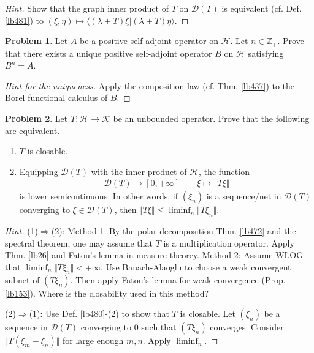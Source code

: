 \documentclass[12pt,b5paper,notitlepage]{article}
\theoremstyle{definition}
\newtheorem{prob}{\color{red}Problem}[section]
\theoremstyle{plain}
\newcommand{\Dom}{\mathscr{D}}
\newcommand{\bk}[1]{\langle {#1}\rangle}
\newcommand{\Zbb}{\mathbb Z}
\newcommand{\Rbb}{\mathbb R}
\newcommand{\MH}{\mathcal H}
\newcommand{\MK}{\mathcal K}
\numberwithin{equation}{section}
\begin{document}
\begin{proof}[Hint]
Show that the graph inner product of $T$ on $\Dom(T)$ is equivalent (cf. Def. \ref{lb481}) to $(\xi,\eta)\mapsto\bk{(\lambda+T)\xi|(\lambda+T)\eta}$.
\end{proof}


\begin{prob}
Let $A$ be a positive self-adjoint operator on $\MH$. Let $n\in\Zbb_+$. Prove that there exists a unique positive self-adjoint operator $B$ on $\MH$ satisfying $B^n=A$.
\end{prob}


\begin{proof}[Hint for the uniqueness]
Apply the composition law (cf. Thm. \ref{lb437}) to the Borel functional calculus of $B$.
\end{proof}


\begin{prob}
Let $T:\MH\rightarrow\MK$ be an unbounded operator. Prove that the following are equivalent.
\begin{enumerate}
\item[(1)] $T$ is closable.
\item[(2)] Equipping $\Dom(T)$ with the inner product of $\MH$, the function
\begin{align*}
\Dom(T)\rightarrow[0,+\infty]\qquad \xi\mapsto \Vert T\xi\Vert
\end{align*} 
is lower semicontinuous. In other words, if $(\xi_n)$ is a sequence/net in $\Dom(T)$ converging to $\xi\in\Dom(T)$, then $\Vert T\xi\Vert\leq\liminf_n\Vert T\xi_n\Vert$.
\end{enumerate}
\end{prob}


\begin{proof}[Hint]
(1)$\Rightarrow$(2): Method 1: By the polar decomposition Thm. \ref{lb472} and the spectral theorem, one may assume that $T$ is a multiplication operator. Apply Thm. \ref{lb26} and Fatou's lemma in measure theorey. Method 2: Assume WLOG that $\liminf_n\Vert T\xi_n\Vert<+\infty$. Use Banach-Alaoglu to choose a weak convergent subnet of $(T\xi_n)$. Then apply Fatou's lemma for weak convergence (Prop. \ref{lb153}). Where is the closability used in this method?

(2)$\Rightarrow$(1): Use Def. \ref{lb480}-(2) to show that $T$ is closable. Let $(\xi_n)$ be a sequence in $\Dom(T)$ converging to $0$ such that $(T\xi_n)$ converges. Consider $\Vert T(\xi_m-\xi_n)\Vert$ for large enough $m,n$. Apply $\liminf_n$.
\end{proof}
\end{document}
